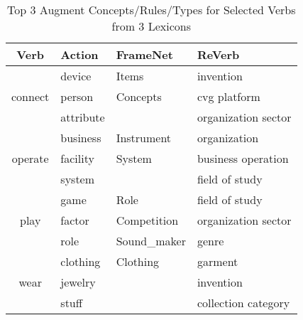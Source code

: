 \begin{table}[th]
\centering
\scriptsize
\caption{Top 3 Augment Concepts/Rules/Types for Selected Verbs
from 3 Lexicons}
\begin{tabular}{|c|l|l|l|}
\hline
Verb  & Action     & FrameNet   & ReVerb \\
\hline
\multirow{3}{*}{connect} & device         &  Items  & invention \\
      & person            &   Concepts    & cvg platform \\
      & attribute &       & organization sector \\
      \hline
\multirow{3}{*}{operate} &  business & Instrument   &  organization \\
      & facility            & System   & business operation \\
      & system             &  & field of study \\
      \hline
\multirow{3}{*}{play} &  game            & Role  & field of study \\
      &  factor            & Competition & organization sector \\
      &  role & Sound\_maker & genre \\
      \hline
\multirow{3}{*}{wear} & clothing            & Clothing   & garment \\
      &  jewelry            &       & invention \\
      &  stuff            &       & collection category \\
      \hline
\end{tabular}%
\label{snapshot}
\end{table}


